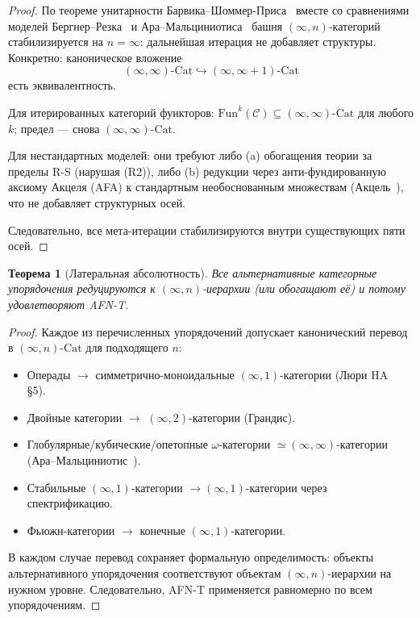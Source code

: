 \documentclass[11pt]{article}
\theoremstyle{plain}
\newtheorem{theorem}{Теорема}[section]
\theoremstyle{definition}
\newcommand{\cC}{\mathcal{C}}
\newcommand{\Fun}{\mathrm{Fun}}
\newcommand{\Cat}{\mathrm{Cat}}
\begin{document}
\begin{proof}
По теореме унитарности Барвика--Шоммер-Приса~\cite{BarwickSchommerPries2021} вместе со сравнениями моделей Бергнер--Резка~\cite{BergnerRezk2013} и Ара--Мальциниотиса~\cite{AraMaltsiniotis2017} башня $(\infty, n)$-категорий стабилизируется на $n = \infty$: дальнейшая итерация не добавляет структуры. Конкретно: каноническое вложение
\[ (\infty, \infty)\text{-}\Cat \hookrightarrow (\infty, \infty + 1)\text{-}\Cat \]
есть эквивалентность.

Для итерированных категорий функторов: $\Fun^k(\cC) \subseteq (\infty, \infty)\text{-}\Cat$ для любого $k$; предел — снова $(\infty, \infty)$-$\Cat$.

Для нестандартных моделей: они требуют либо (a) обогащения теории за пределы R-S (нарушая (R2)), либо (b) редукции через анти-фундированную аксиому Акцеля (AFA) к стандартным необоснованным множествам (Акцель~\cite{Aczel1988}), что не добавляет структурных осей.

Следовательно, все мета-итерации стабилизируются внутри существующих пяти осей.
\end{proof}

\begin{theorem}[Латеральная абсолютность]\label{thm:lateral}
Все альтернативные категорные упорядочения редуцируются к $(\infty, n)$-иерархии (или обогащают её) и потому удовлетворяют AFN-T.
\end{theorem}

\begin{proof}
Каждое из перечисленных упорядочений допускает канонический перевод в $(\infty, n)$-$\Cat$ для подходящего $n$:
\begin{itemize}
\item Операды $\to$ симметрично-моноидальные $(\infty, 1)$-категории (Люри HA~\cite{LurieHA} \S 5).
\item Двойные категории $\to$ $(\infty, 2)$-категории (Грандис).
\item Глобулярные/кубические/опетопные $\omega$-категории $\simeq (\infty, \infty)$-категории (Ара--Мальциниотис~\cite{AraMaltsiniotis2017}).
\item Стабильные $(\infty, 1)$-категории $\to (\infty, 1)$-категории через спектрификацию.
\item Фьюжн-категории $\to$ конечные $(\infty, 1)$-категории.
\end{itemize}
В каждом случае перевод сохраняет формальную определимость: объекты альтернативного упорядочения соответствуют объектам $(\infty, n)$-иерархии на нужном уровне. Следовательно, AFN-T применяется равномерно по всем упорядочениям.
\end{proof}
\end{document}

